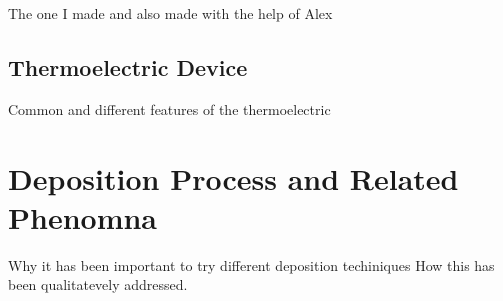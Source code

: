 The one I made and also made with the help of Alex

\subsection{Thermoelectric Device}

Common and different features of the thermoelectric

\section{Deposition Process and Related Phenomna}

Why it has been important to try different deposition techiniques
How this has been qualitatevely addressed.
 